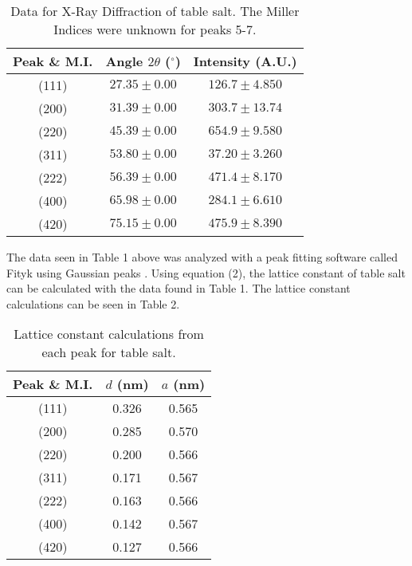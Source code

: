 \documentclass[twocolumn]{article}
\begin{document}
\begin{table}[htp]
\begin{center}
\begin{tabular}{|c|c|c|}
	\hline \small{\textbf{Peak \& M.I.}} & \small{\textbf{Angle $2\theta$ ($^{\circ}$)}} & \small{\textbf{Intensity (A.U.)}} \\ \hline
	 (111)& $27.35\pm0.00$ & $126.7\pm4.850$ \\ \hline
	 (200)& $31.39\pm0.00$ & $303.7\pm13.74$ \\ \hline
	 (220)& $45.39\pm0.00$ & $654.9\pm9.580$ \\ \hline
	 (311)& $53.80\pm0.00$ & $37.20\pm3.260$ \\ \hline
	 (222)& $56.39\pm0.00$ & $471.4\pm8.170$ \\ \hline
	 (400)& $65.98\pm0.00$ & $284.1\pm6.610$ \\ \hline
	 (420)& $75.15\pm0.00$ & $475.9\pm8.390$ \\ \hline 
\end{tabular}
\caption{Data for X-Ray Diffraction of table salt. The Miller Indices were unknown for peaks 5-7.}
\end{center}
\label{default}
\end{table}%
\newline
The data seen in Table 1 above was analyzed with a peak fitting software called Fityk using Gaussian peaks \cite{Fityk}. Using equation (2), the lattice constant of table salt can be calculated with the data found in Table 1. The lattice constant calculations can be seen in Table 2.
\begin{table}[htp]
\begin{center}
\begin{tabular}{|c|c|c|}
	\hline \small{\textbf{Peak \& M.I.}} &\small{\textbf{$d$ (nm)}} & \small{\textbf{$a$ (nm)}} \\ \hline
	(111) & 0.326 & 0.565 \\ \hline
	(200) & 0.285 & 0.570 \\ \hline
	(220) & 0.200 & 0.566 \\ \hline
	(311) & 0.171 & 0.567 \\ \hline
	(222) & 0.163 & 0.566 \\ \hline
	(400) & 0.142 & 0.567 \\ \hline
	(420) & 0.127 & 0.566 \\ \hline
\end{tabular}
\caption{Lattice constant calculations from each peak for table salt.}
\end{center}
\label{default}
\end{table}%
\end{document}
